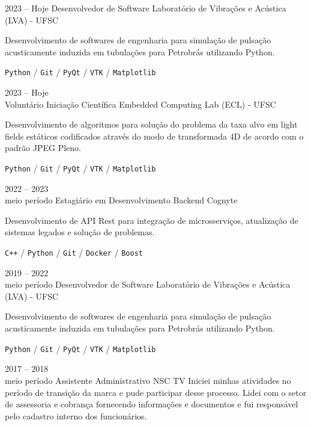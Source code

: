 \documentclass[11pt]{developercv} %
\begin{document}
\begin{entrylist}
	\entry
		{2023 -- Hoje}
		{Desenvolvedor de Software}
		{Laboratório de Vibrações e Acústica (LVA) - UFSC}
		{
			Desenvolvimento de softwares de engenharia para simulação de pulsação acusticamente induzida em tubulações para Petrobrás utilizando Python. 
			
			\texttt{Python} / \texttt{Git} / \texttt{PyQt} / \texttt{VTK} / \texttt{Matplotlib}
		}

	\entry
		{2023 -- Hoje \\ \footnotesize{Voluntário}}
		{Iniciação Científica}
		{Embedded Computing Lab (ECL) - UFSC}
		{
			Desenvolvimento de algoritmos para solução do problema da taxa alvo em light fields estáticos codificados através do modo de transformada 4D de acordo com o padrão JPEG Pleno.

			\texttt{Python} / \texttt{Git} / \texttt{PyQt} / \texttt{VTK} / \texttt{Matplotlib}
		}

	\entry
		{2022 -- 2023 \\ \footnotesize{meio período}}
		{Estagiário em Desenvolvimento Backend}
		{Cognyte}
		{
			Desenvolvimento de API Rest para integração de microsserviços, atualização de sistemas legados e solução de problemas.
            
            \texttt{C++} / \texttt{Python} / \texttt{Git} / \texttt{Docker} / \texttt{Boost}
        }
	\entry
		{2019 -- 2022 \\ \footnotesize{meio período}}
		{Desenvolvedor de Software}
		{Laboratório de Vibrações e Acústica (LVA) - UFSC}
		{
			Desenvolvimento de softwares de engenharia para simulação de pulsação acusticamente induzida em tubulações para Petrobrás utilizando Python. 
			
            \texttt{Python} / \texttt{Git} / \texttt{PyQt} / \texttt{VTK} / \texttt{Matplotlib}
        }
	\entry
		{2017 -- 2018 \\ \footnotesize{meio período}}
		{Assistente Administrativo}
		{NSC TV}
		{
			Iniciei minhas atividades no período de transição da marca e pude participar desse processo.
			Lidei com o setor de assessoria e cobrança fornecendo informações e documentos e fui responsável pelo cadastro interno dos funcionários.
        }
\end{entrylist}

\end{document}
